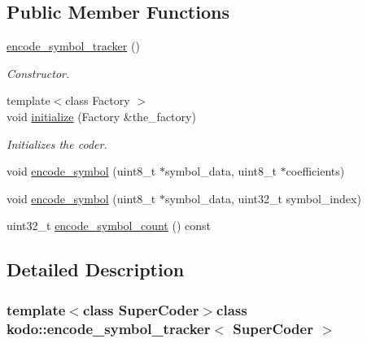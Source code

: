 \subsection*{Public Member Functions}
\begin{DoxyCompactItemize}
\item 
\hypertarget{classkodo_1_1encode__symbol__tracker_ae799ea4de17cead6de3df2428249a82b}{\hyperlink{classkodo_1_1encode__symbol__tracker_ae799ea4de17cead6de3df2428249a82b}{encode\-\_\-symbol\-\_\-tracker} ()}\label{classkodo_1_1encode__symbol__tracker_ae799ea4de17cead6de3df2428249a82b}

\begin{DoxyCompactList}\small\item\em Constructor. \end{DoxyCompactList}\item 
{\footnotesize template$<$class Factory $>$ }\\void \hyperlink{classkodo_1_1encode__symbol__tracker_abef531a3f3433727d78b1b9352795452}{initialize} (Factory \&the\-\_\-factory)
\begin{DoxyCompactList}\small\item\em Initializes the coder. \end{DoxyCompactList}\item 
void \hyperlink{classkodo_1_1encode__symbol__tracker_a4759ac212e553894ad3fb0775cfc5216}{encode\-\_\-symbol} (uint8\-\_\-t $\ast$symbol\-\_\-data, uint8\-\_\-t $\ast$coefficients)
\begin{DoxyCompactList}\small\item\em \end{DoxyCompactList}\item 
void \hyperlink{classkodo_1_1encode__symbol__tracker_ace33cd516fddc799fdcab68a110f16b3}{encode\-\_\-symbol} (uint8\-\_\-t $\ast$symbol\-\_\-data, uint32\-\_\-t symbol\-\_\-index)
\begin{DoxyCompactList}\small\item\em \end{DoxyCompactList}\item 
uint32\-\_\-t \hyperlink{classkodo_1_1encode__symbol__tracker_af2a4c33b0fa86380ad8fa7a9ccbd0a21}{encode\-\_\-symbol\-\_\-count} () const 
\end{DoxyCompactItemize}


\subsection{Detailed Description}
\subsubsection*{template$<$class Super\-Coder$>$class kodo\-::encode\-\_\-symbol\-\_\-tracker$<$ Super\-Coder $>$}

